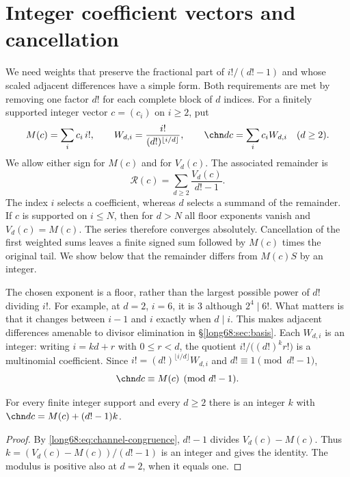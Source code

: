 \section{Integer coefficient vectors and cancellation}\label{long68:sec:channels}

We need weights that preserve the fractional part of $i!/(d!-1)$
and whose scaled adjacent differences have a simple form. Both requirements
are met by removing one factor $d!$ for each complete block of $d$
indices. For a finitely supported integer vector $c=(c_i)$ on $i\ge2$,
put
\[
 M(c)=\sum_i c_i\,i!,\qquad
 W_{d,i}=\frac{i!}{(d!)^{\lfloor i/d\rfloor}},\qquad
 \chn dc=\sum_i c_iW_{d,i}\quad(d\ge2).
\]
We allow either sign for $M(c)$ and
for $V_d(c)$. The associated remainder is
\[
 \mathcal R(c)=\sum_{d\ge2}\frac{V_d(c)}{d!-1}.
\]
The index $i$ selects a coefficient, whereas $d$ selects a summand
of the remainder. If $c$ is supported on $i\le N$, then for $d>N$
all floor exponents vanish and $V_d(c)=M(c)$. The series therefore
converges absolutely. Cancellation of the first weighted sums leaves
a finite signed sum followed by $M(c)$ times the original tail.
We show below that the remainder differs from $M(c)S$ by an integer.

The chosen exponent is a floor, rather than the largest possible power
of $d!$ dividing $i!$. For example, at $d=2$, $i=6$, it is $3$
although $2^4\mid6!$. What matters is that it changes between $i-1$
and $i$ exactly when $d\mid i$. This makes adjacent differences
amenable to divisor elimination in \S\ref{long68:sec:basis}.
Each $W_{d,i}$ is an integer: writing $i=kd+r$ with $0\le r<d$, the quotient
$i!/\bigl((d!)^kr!\bigr)$ is a multinomial coefficient.  Since
$i!=(d!)^{\lfloor i/d\rfloor}W_{d,i}$ and $d!\equiv1\pmod{d!-1}$,
\begin{equation}\label{long68:eq:channel-congruence}
 \chn dc\equiv M(c)\pmod{d!-1}.
\end{equation}

\begin{theorem}\label{long68:res:normalform}
For every finite integer support and every $d\ge2$ there is an integer $k$
with $\chn dc=M(c)+(d!-1)k$.
\end{theorem}

\begin{proof}
By \eqref{long68:eq:channel-congruence}, $d!-1$ divides
$V_d(c)-M(c)$.  Thus $k=(V_d(c)-M(c))/(d!-1)$ is an integer and gives the
identity.  The modulus is positive also at $d=2$, when it equals one.
\end{proof}

